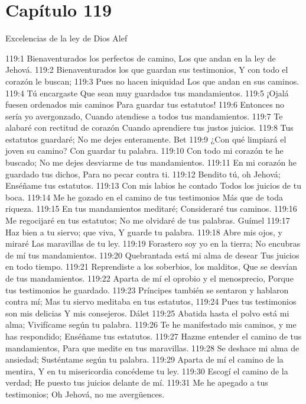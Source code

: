 \section*{Capítulo 119}
Excelencias de la ley de Dios 
Alef 
 
119:1 Bienaventurados los perfectos de camino, 
Los que andan en la ley de Jehová. 
119:2 Bienaventurados los que guardan sus testimonios, 
Y con todo el corazón le buscan; 
119:3 Pues no hacen iniquidad 
Los que andan en sus caminos. 
119:4 Tú encargaste 
Que sean muy guardados tus mandamientos. 
119:5 ¡Ojalá fuesen ordenados mis caminos 
Para guardar tus estatutos! 
119:6 Entonces no sería yo avergonzado, 
Cuando atendiese a todos tus mandamientos. 
119:7 Te alabaré con rectitud de corazón 
Cuando aprendiere tus justos juicios. 
119:8 Tus estatutos guardaré; 
No me dejes enteramente. 
Bet 
119:9 ¿Con qué limpiará el joven su camino? 
Con guardar tu palabra. 
119:10 Con todo mi corazón te he buscado; 
No me dejes desviarme de tus mandamientos. 
119:11 En mi corazón he guardado tus dichos, 
Para no pecar contra ti. 
119:12 Bendito tú, oh Jehová; 
Enséñame tus estatutos. 
119:13 Con mis labios he contado 
Todos los juicios de tu boca. 
119:14 Me he gozado en el camino de tus testimonios 
Más que de toda riqueza. 
119:15 En tus mandamientos meditaré; 
Consideraré tus caminos. 
119:16 Me regocijaré en tus estatutos; 
No me olvidaré de tus palabras. 
Guímel 
119:17 Haz bien a tu siervo; que viva, 
Y guarde tu palabra. 
119:18 Abre mis ojos, y miraré 
Las maravillas de tu ley. 
119:19 Forastero soy yo en la tierra; 
No encubras de mí tus mandamientos. 
119:20 Quebrantada está mi alma de desear 
Tus juicios en todo tiempo. 
119:21 Reprendiste a los soberbios, los malditos, 
Que se desvían de tus mandamientos. 
119:22 Aparta de mí el oprobio y el menosprecio, 
Porque tus testimonios he guardado. 
119:23 Príncipes también se sentaron y hablaron contra mí; 
Mas tu siervo meditaba en tus estatutos, 
119:24 Pues tus testimonios son mis delicias 
Y mis consejeros. 
Dálet 
119:25 Abatida hasta el polvo está mi alma; 
Vivifícame según tu palabra. 
119:26 Te he manifestado mis caminos, y me has respondido; 
Enséñame tus estatutos. 
119:27 Hazme entender el camino de tus mandamientos, 
Para que medite en tus maravillas. 
119:28 Se deshace mi alma de ansiedad; 
Susténtame según tu palabra. 
119:29 Aparta de mí el camino de la mentira, 
Y en tu misericordia concédeme tu ley. 
119:30 Escogí el camino de la verdad; 
He puesto tus juicios delante de mí. 
119:31 Me he apegado a tus testimonios; 
Oh Jehová, no me avergüences. 
